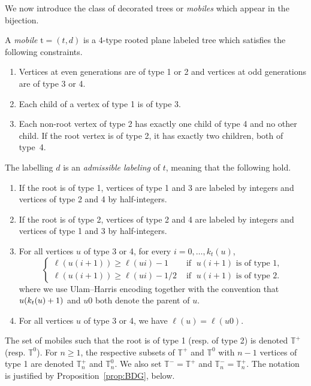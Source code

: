 \documentclass[AHL,Unicode,longabstracts,published]{cedram}
\newcommand{\bbT}{\mathbb{T}}
\newcommand{\rt}{\mathrm{t}}
\newcommand*{\romanenumi}{\renewcommand*{\theenumi}{\roman{enumi}}}
\begin{document}
We now introduce the class of decorated trees or \emph{mobiles} which appear in the bijection.

\begin{defi}\label{def:mobiles}
A \emph{mobile} $\rt=(t,d)$ is a 4-type rooted plane labeled tree which satisfies the following constraints.
\begin{enumerate}\romanenumi
\item \label{defi4.2.i} Vertices at even generations are of type 1 or 2 and vertices at odd generations are of type 3 or 4.
\item \label{defi4.2.ii} Each child of a vertex of type 1 is of type 3.
\item \label{defi4.2.iii} Each non-root vertex of type 2 has exactly one child of type 4 and no other child. If the root vertex is of type 2, it has exactly two children, both of type~4.
\end{enumerate}
The labelling $d$ is an \emph{admissible labeling} of $t$, meaning that the following hold.
\begin{enumerate}
\item \label{defi4.2.1} If the root is of type 1, vertices of type 1 and 3 are labeled by integers and vertices of type 2 and 4 by half-integers.
\item \label{defi4.2.2} If the root is of type 2, vertices of type 2 and 4 are labeled by integers and vertices of type 1 and 3 by half-integers.
\item \label{defi4.2.3} For all vertices $u$ of type 3 or 4, for every $i=0,\ldots,k_t(u)$,
\[
\begin{cases}
\ell(u(i+1))\geq \ell(ui)-1& \text{ if }\;u(i+1) \text{ is of type 1},\\
\ell(u(i+1))\geq \ell(ui)-1/2& \text{ if }\;u(i+1) \text{ is of type 2}.
\end{cases}
\]
where we use Ulam--Harris encoding together with the convention that $u(k_t(u)\linebreak +1)$ and $u0$ both denote the parent of $u$.
\item \label{defi4.2.4} For all vertices $u$ of type 3 or 4, we have $\ell(u)=\ell(u0)$.
\end{enumerate}
\end{defi}


The set of mobiles such that the root is of type 1 (resp. of type 2) is denoted $\bbT^+$ (resp. $\bbT^0$). For $n\geq 1$, the respective subsets of $\bbT^+$ and $\bbT^0$ with $n-1$ vertices of type 1 are denoted $\bbT_n^+$ and $\bbT^0_n$. We also set $\bbT^-=\bbT^+$ and $\bbT_n^-=\bbT_n^+$. The notation is justified by Proposition~\ref{prop:BDG}, below.
\end{document}

